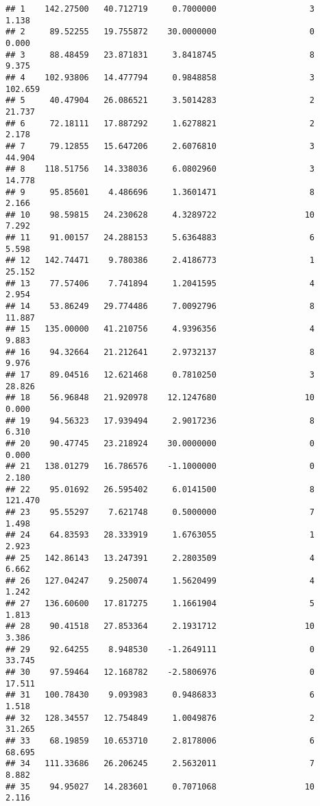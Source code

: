 \documentclass[]{article}
\begin{document}
\begin{verbatim}
## 1    142.27500   40.712719     0.7000000                   3      1.138
## 2     89.52255   19.755872    30.0000000                   0      0.000
## 3     88.48459   23.871831     3.8418745                   8      9.375
## 4    102.93806   14.477794     0.9848858                   3    102.659
## 5     40.47904   26.086521     3.5014283                   2     21.737
## 6     72.18111   17.887292     1.6278821                   2      2.178
## 7     79.12855   15.647206     2.6076810                   3     44.904
## 8    118.51756   14.338036     6.0802960                   3     14.778
## 9     95.85601    4.486696     1.3601471                   8      2.166
## 10    98.59815   24.230628     4.3289722                  10      7.292
## 11    91.00157   24.288153     5.6364883                   6      5.598
## 12   142.74471    9.780386     2.4186773                   1     25.152
## 13    77.57406    7.741894     1.2041595                   4      2.954
## 14    53.86249   29.774486     7.0092796                   8     11.887
## 15   135.00000   41.210756     4.9396356                   4      9.883
## 16    94.32664   21.212641     2.9732137                   8      9.976
## 17    89.04516   12.621468     0.7810250                   3     28.826
## 18    56.96848   21.920978    12.1247680                  10      0.000
## 19    94.56323   17.939494     2.9017236                   8      6.310
## 20    90.47745   23.218924    30.0000000                   0      0.000
## 21   138.01279   16.786576    -1.1000000                   0      2.180
## 22    95.01692   26.595402     6.0141500                   8    121.470
## 23    95.55297    7.621748     0.5000000                   7      1.498
## 24    64.83593   28.333919     1.6763055                   1      2.923
## 25   142.86143   13.247391     2.2803509                   4      6.662
## 26   127.04247    9.250074     1.5620499                   4      1.242
## 27   136.60600   17.817275     1.1661904                   5      1.813
## 28    90.41518   27.853364     2.1931712                  10      3.386
## 29    92.64255    8.948530    -1.2649111                   0     33.745
## 30    97.59464   12.168782    -2.5806976                   0     17.511
## 31   100.78430    9.093983     0.9486833                   6      1.518
## 32   128.34557   12.754849     1.0049876                   2     31.265
## 33    68.19859   10.653710     2.8178006                   6     68.695
## 34   111.33686   26.206245     2.5632011                   7      8.882
## 35    94.95027   14.283601     0.7071068                  10      2.116

\end{verbatim}
\end{document}
